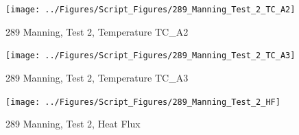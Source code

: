\documentclass[12pt,oneside]{book}
\begin{document}
\begin{figure}[!ht]
\texttt{[image: ../Figures/Script\_Figures/289\_Manning\_Test\_2\_TC\_A2]}
\caption{289 Manning, Test 2, Temperature TC\_A2}
\label{fig:289_Manning_Test_2_TC_A2}
\end{figure}

\begin{figure}[!ht]
\texttt{[image: ../Figures/Script\_Figures/289\_Manning\_Test\_2\_TC\_A3]}
\caption{289 Manning, Test 2, Temperature TC\_A3}
\label{fig:289_Manning_Test_2_TC_A3}
\end{figure}

\begin{figure}[!ht]
\texttt{[image: ../Figures/Script\_Figures/289\_Manning\_Test\_2\_HF]}
\caption{289 Manning, Test 2, Heat Flux}
\label{fig:289_Manning_Test_2_HF}
\end{figure}
\end{document}

